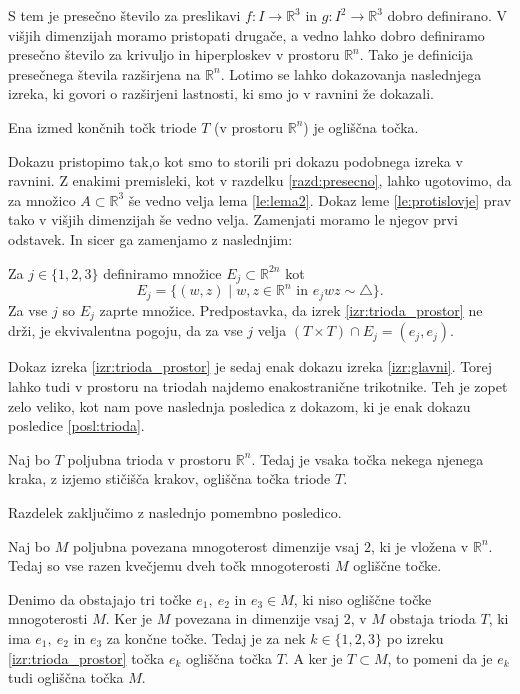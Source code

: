 \documentclass[mat1]{fmfdelo}
\newcommand{\R}{\mathbb R}
\begin{document}
S tem je presečno število za preslikavi $f \colon I \to \R^3$ in $g \colon I^2 \to \R^3$ dobro definirano. V višjih dimenzijah moramo pristopati drugače, a vedno lahko dobro definiramo presečno število za krivuljo in hiperploskev v prostoru $\R^n$. Tako je definicija presečnega števila razširjena na $\R^n$. Lotimo se lahko dokazovanja naslednjega izreka, ki govori o razširjeni lastnosti, ki smo jo v ravnini že dokazali.

\begin{izrek}\label{izr:trioda_prostor}
Ena izmed končnih točk triode $T$ (v prostoru $\R^n$) je ogliščna točka.
\end{izrek} 

Dokazu pristopimo tak,o kot smo to storili pri dokazu podobnega izreka v ravnini. Z enakimi premisleki, kot v razdelku \ref{razd:presecno}, lahko ugotovimo, da za množico $A \subset \R^3$ še vedno velja lema \ref{le:lema2}. Dokaz leme \ref{le:protislovje} prav tako v višjih dimenzijah še vedno velja. Zamenjati moramo le njegov prvi odstavek. In sicer ga zamenjamo z  naslednjim:

Za $j \in \{1, 2, 3\}$ definiramo množice $E_j \subset \R^{2n}$ kot 
\[
E_j = \{ (w, z) \mid w, z \in \R^n \text{ in } e_jwz \sim \triangle \}.
\] 
Za vse $j$ so $E_j$ zaprte množice. Predpostavka, da izrek \ref{izr:trioda_prostor} ne drži, je ekvivalentna pogoju, da za vse $j$ velja $(T \times T) \cap E_j = (e_j, e_j)$.

Dokaz izreka \ref{izr:trioda_prostor} je sedaj enak dokazu izreka \ref{izr:glavni}. Torej lahko tudi v prostoru na triodah najdemo enakostranične trikotnike. Teh je zopet zelo veliko, kot nam pove naslednja posledica z dokazom, ki je enak dokazu posledice \ref{posl:trioda}.

\begin{posledica}
Naj bo $T$ poljubna trioda v prostoru $\R^n$. Tedaj je vsaka točka nekega njenega kraka, z izjemo stičišča krakov, ogliščna točka triode $T$.
\end{posledica}

Razdelek zaključimo z naslednjo pomembno posledico.

\begin{posledica}
Naj bo $M$ poljubna povezana mnogoterost dimenzije vsaj $2$, ki je vložena v $\R^n$. Tedaj so vse razen kvečjemu dveh točk mnogoterosti $M$ ogliščne točke.
\end{posledica}

\proof
Denimo da obstajajo tri točke $e_1,\ e_2$ in $e_3 \in M$, ki niso ogliščne točke mnogoterosti $M$. Ker je $M$ povezana in dimenzije vsaj $2$, v $M$ obstaja trioda $T$, ki ima $e_1,\ e_2$ in $e_3$ za končne točke. Tedaj je za nek $k \in \{1, 2, 3\}$ po izreku \ref{izr:trioda_prostor} točka $e_k$ ogliščna točka $T$. A ker je $T \subset M$, to pomeni da je $e_k$ tudi ogliščna točka $M$.
\endproof
\end{document}
